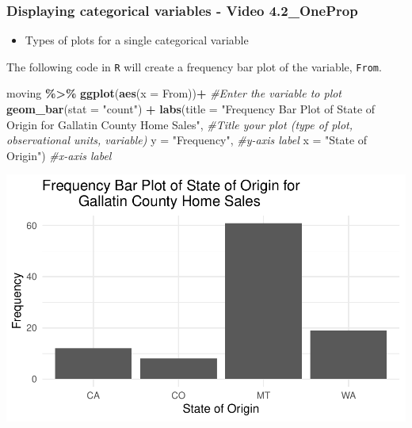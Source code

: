 \documentclass[
]{report}
\newenvironment{Shaded}{\begin{snugshade}}{\end{snugshade}}
\newcommand{\AttributeTok}[1]{\textcolor[rgb]{0.13,0.29,0.53}{#1}}
\newcommand{\CommentTok}[1]{\textcolor[rgb]{0.56,0.35,0.01}{\textit{#1}}}
\newcommand{\FunctionTok}[1]{\textcolor[rgb]{0.13,0.29,0.53}{\textbf{#1}}}
\newcommand{\NormalTok}[1]{#1}
\newcommand{\SpecialCharTok}[1]{\textcolor[rgb]{0.81,0.36,0.00}{\textbf{#1}}}
\newcommand{\StringTok}[1]{\textcolor[rgb]{0.31,0.60,0.02}{#1}}
\providecommand{\tightlist}{%
  \setlength{\itemsep}{0pt}\setlength{\parskip}{0pt}}
\begin{document}
\vspace{0.2in}

\subsubsection*{Displaying categorical variables - Video 4.2\_OneProp}\label{displaying-categorical-variables---video-4.2_oneprop}

\begin{itemize}
\tightlist
\item
  Types of plots for a single categorical variable
\end{itemize}

\vspace{0.4in}

The following code in \texttt{R} will create a frequency bar plot of the variable, \texttt{From}.

\begin{Shaded}
\begin{Highlighting}[]
\NormalTok{moving }\SpecialCharTok{\%\textgreater{}\%}
    \FunctionTok{ggplot}\NormalTok{(}\FunctionTok{aes}\NormalTok{(}\AttributeTok{x =}\NormalTok{ From))}\SpecialCharTok{+} \CommentTok{\#Enter the variable to plot}
    \FunctionTok{geom\_bar}\NormalTok{(}\AttributeTok{stat =} \StringTok{"count"}\NormalTok{) }\SpecialCharTok{+} 
    \FunctionTok{labs}\NormalTok{(}\AttributeTok{title =} \StringTok{"Frequency Bar Plot of State of Origin for}
\StringTok{         Gallatin County Home Sales"}\NormalTok{, }
         \CommentTok{\#Title your plot (type of plot, observational units, variable)}
       \AttributeTok{y =} \StringTok{"Frequency"}\NormalTok{, }\CommentTok{\#y{-}axis label}
       \AttributeTok{x =} \StringTok{"State of Origin"}\NormalTok{) }\CommentTok{\#x{-}axis label}
\end{Highlighting}
\end{Shaded}

\begin{center}\includegraphics[width=0.65\linewidth]{03-VN03-EDA_OneCatSimulation_files/figure-latex/unnamed-chunk-5-1} \end{center}
\end{document}
